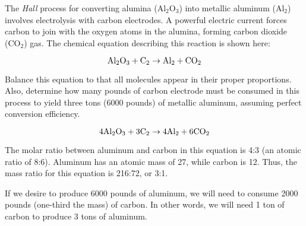 

The {\it Hall} process for converting alumina (Al$_{2}$O$_{3}$) into metallic aluminum (Al$_{2}$) involves electrolysis with carbon electrodes.  A powerful electric current forces carbon to join with the oxygen atoms in the alumina, forming carbon dioxide (CO$_{2}$) gas.  The chemical equation describing this reaction is shown here:

$$\hbox{Al}_2\hbox{O}_3 + \hbox{C}_2 \to \hbox{Al}_2 + \hbox{CO}_2$$

Balance this equation to that all molecules appear in their proper proportions.  Also, determine how many pounds of carbon electrode must be consumed in this process to yield three tons (6000 pounds) of metallic aluminum, assuming perfect conversion efficiency.







$$4\hbox{Al}_2\hbox{O}_3 + 3\hbox{C}_2 \to 4\hbox{Al}_2 + 6\hbox{CO}_2$$







The molar ratio between aluminum and carbon in this equation is 4:3 (an atomic ratio of 8:6).  Aluminum has an atomic mass of 27, while carbon is 12.  Thus, the mass ratio for this equation is 216:72, or 3:1.  

If we desire to produce 6000 pounds of aluminum, we will need to consume 2000 pounds (one-third the mass) of carbon.  In other words, we will need 1 ton of carbon to produce 3 tons of aluminum.





